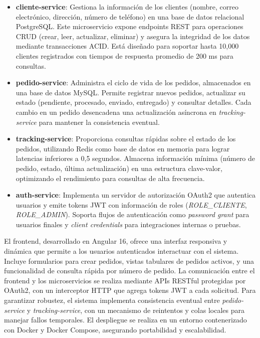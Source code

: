 \documentclass[a4paper,12pt]{article}
\begin{document}
\begin{itemize}
    \item \textbf{cliente-service}: Gestiona la información de los clientes (nombre, correo electrónico, dirección, número de teléfono) en una base de datos relacional PostgreSQL. Este microservicio expone endpoints REST para operaciones CRUD (crear, leer, actualizar, eliminar) y asegura la integridad de los datos mediante transacciones ACID. Está diseñado para soportar hasta 10,000 clientes registrados con tiempos de respuesta promedio de 200 ms para consultas.
    \item \textbf{pedido-service}: Administra el ciclo de vida de los pedidos, almacenados en una base de datos MySQL. Permite registrar nuevos pedidos, actualizar su estado (pendiente, procesado, enviado, entregado) y consultar detalles. Cada cambio en un pedido desencadena una actualización asíncrona en \textit{tracking-service} para mantener la consistencia eventual.
    \item \textbf{tracking-service}: Proporciona consultas rápidas sobre el estado de los pedidos, utilizando Redis como base de datos en memoria para lograr latencias inferiores a 0,5 segundos. Almacena información mínima (número de pedido, estado, última actualización) en una estructura clave-valor, optimizando el rendimiento para consultas de alta frecuencia.
    \item \textbf{auth-service}: Implementa un servidor de autorización OAuth2 que autentica usuarios y emite tokens JWT con información de roles (\textit{ROLE\_CLIENTE}, \textit{ROLE\_ADMIN}). Soporta flujos de autenticación como \textit{password grant} para usuarios finales y \textit{client credentials} para integraciones internas o pruebas.
\end{itemize}

El frontend, desarrollado en Angular 16, ofrece una interfaz responsiva y dinámica que permite a los usuarios autenticados interactuar con el sistema. Incluye formularios para crear pedidos, vistas tabulares de pedidos activos, y una funcionalidad de consulta rápida por número de pedido. La comunicación entre el frontend y los microservicios se realiza mediante APIs RESTful protegidas por OAuth2, con un interceptor HTTP que agrega tokens JWT a cada solicitud. Para garantizar robustez, el sistema implementa consistencia eventual entre \textit{pedido-service} y \textit{tracking-service}, con un mecanismo de reintentos y colas locales para manejar fallos temporales. El despliegue se realiza en un entorno contenerizado con Docker y Docker Compose, asegurando portabilidad y escalabilidad.
\end{document}

